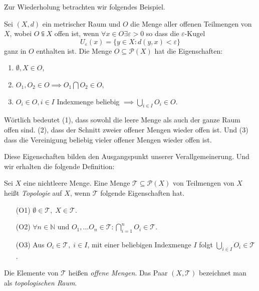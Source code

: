 Zur Wiederholung betrachten wir folgendes Beispiel. 

{
    Sei $(X,d)$ ein metrischer Raum und $O$ die Menge aller offenen Teilmengen von $X$,
    wobei $O \subseteqq X$ offen ist, wenn $\forall x \in O \exists \varepsilon > 0$ so dass die $\varepsilon$-Kugel
    $$
        U_\varepsilon(x) = \{ y \in X : d(y,x) < \varepsilon \}
    $$
    ganz in $O$ enthalten ist. 
    Die Menge $O \subseteq \mathcal{P}(X)$ hat die Eigenschaften:
    \begin{enumerate}
        \item $\emptyset, X \in O$,
        \item $O_1, O_2 \in O \implies O_1 \bigcap O_2 \in O$,
        \item $O_i \in O, i \in I$ Indexmenge beliebig $\implies \bigcup_{i \in I} O_i \in O$.
    \end{enumerate}
    Wörtlich bedeutet (1), dass sowohl die leere Menge als auch der ganze Raum
    offen sind. (2), dass der Schnitt zweier offener Mengen wieder offen ist.
    Und (3) dass die Vereinigung beliebig vieler offener Mengen wieder offen ist.
}

Diese Eigenschaften bilden den Ausgangspunkt unserer Verallgemeinerung. Und wir erhalten die folgende Definition:


{
    Sei $X$ eine nichtleere Menge. Eine Menge $\mathcal{T} \subseteq \mathcal{P}(X)$ von Teilmengen 
von $X$ heißt \emph{Topologie} auf $X$, wenn $\mathcal{T}$ folgende Eigenschaften hat.
\begin{itemize}
    \item[(O1)] $\emptyset \in \mathcal{T}, \; X \in \mathcal{T}$.
    \item[(O2)] $\forall n \in \mathbb{N} $ und $ O_1, \dots O_n \in \mathcal{T} : 
     \bigcap_{i=1}^{n} O_i \in \mathcal{T}$.
    \item[(O3)] Aus $O_i \in \mathcal{T}, \; i \in I$, mit einer beliebigen Indexmenge $I$ folgt 
    $\bigcup_{i \in I} O_i \in \mathcal{T}$.
\end{itemize}
Die Elemente von $\mathcal{T}$ heißen \emph{offene Mengen}. Das Paar $(X, \mathcal{T})$ 
bezeichnet man als \emph{topologischen Raum}.
}

